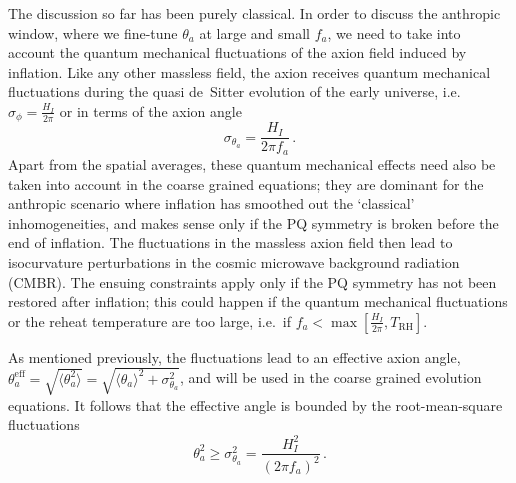 \documentclass[preprint,nofootinbib]{revtex4}
\begin{document}
The discussion so far has been purely classical. In order to discuss the anthropic window, where we fine-tune $\theta_a$ at large and small $f_a$, we need to take into account the quantum mechanical fluctuations of the axion field induced by inflation. Like any other massless field, the axion receives quantum mechanical fluctuations during the quasi de~Sitter evolution of the early universe, i.e.\ $\sigma_{\phi} = \frac{H_I}{2\pi}$ or in terms of the axion angle
\begin{equation}
\sigma_{\theta_a} = \frac{H_I}{2\pi f_a} \,.
\end{equation}
Apart from the spatial averages, these quantum mechanical effects need also be taken into account in the coarse grained equations; they are dominant for the anthropic scenario where inflation has smoothed out the `classical' inhomogeneities, and makes sense only if the PQ symmetry is broken before the end of inflation. The fluctuations in the massless axion field then lead to isocurvature perturbations in the cosmic microwave background radiation (CMBR). The ensuing constraints apply only if the PQ symmetry has not been restored after inflation; this could happen if the quantum mechanical fluctuations or the reheat temperature are too large, i.e.\ if $f_a<\max\left[\frac{H_I}{2\pi},T_\mathrm{RH}\right]$.

As mentioned previously, the fluctuations lead to an effective axion angle, $\theta_a^\mathrm{eff}=\sqrt{\langle \theta_a^2 \rangle}=\sqrt{\langle \theta_a \rangle^2 + \sigma^2_{\theta_a}}$, and will be used in the coarse grained evolution equations. It follows that the effective angle is bounded by the root-mean-square fluctuations
\begin{equation}
 \theta_a^2 \ge \sigma_{\theta_a}^2 = \frac{H^2_I}{(2\pi f_a)^2} \,.\label{eq:isocurvature:constraint:1}
\end{equation}
\end{document}
